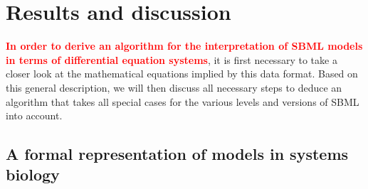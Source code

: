 \documentclass[10pt]{bmc_article}
\newenvironment{bmcformat}{\baselineskip20pt\sloppy\setboolean{publ}{false}}{\baselineskip20pt\sloppy}
\newcommand{\TODO}[1]{\textcolor{red}{\textbf{#1}}}
\begin{document}
\begin{bmcformat}
\section*{Results and discussion}

\TODO{In order to derive an algorithm for the interpretation of SBML models in terms of differential equation systems}, it is
first necessary to take a closer look at the mathematical equations implied by
this data format.
Based on this general description, we will then discuss all necessary steps
to deduce an algorithm that takes all special cases for the various levels and
versions of SBML into account.

\subsection*{A formal representation of models in systems biology}


\end{bmcformat}
\end{document}
